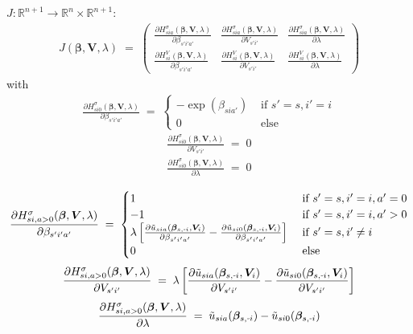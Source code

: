 \documentclass[11pt,fleqn]{article}
\newcommand{\R}{\mathbb{R}}
\newcommand{\bbeta}{\bm{\beta}}
\newcommand{\bV}{\bm{V}}
\newcommand{\tu}{\tilde{u}}
\newcommand{\shortminus}{{\text{\scalebox{0.4}[1.0]{\(-\)}}}}
\newcommand{\minusi}{\shortminus i}
\begin{document}
$J: \R^{n+1} \rightarrow \R^n \times \R^{n+1}$:
\begin{align*}
	J(\bbeta,\bV,\lambda) \;=\; 
	\begin{pmatrix}
		\frac{ \partial H_{sia}^{\sigma}(\bbeta,\bV,\lambda) }{ \partial \beta_{s'i'a'} } & 
		\frac{ \partial H_{sia}^{\sigma}(\bbeta,\bV,\lambda) }{ \partial V_{s'i'} } & 
		\frac{ \partial H_{sia}^{\sigma}(\bbeta,\bV,\lambda) }{ \partial \lambda } \\
		\frac{ \partial H_{si}^{V}(\bbeta,\bV,\lambda) }{ \partial \beta_{s'i'a'} } & 
		\frac{ \partial H_{si}^{V}(\bbeta,\bV,\lambda) }{ \partial V_{s'i'} } & 
		\frac{ \partial H_{si}^{V}(\bbeta,\bV,\lambda) }{ \partial \lambda }
	\end{pmatrix}
\end{align*}
with
\begin{align*}
	\frac{ \partial H_{si0}^{\sigma}(\bbeta,\bV,\lambda) }{ \partial \beta_{s'i'a'} } \;=\; 
	\begin{cases}
		-\exp(\beta_{sia'}) & \text{ if } s'=s, i'=i \\
		0 & \text{ else}
	\end{cases} 
\end{align*}
\begin{align*}
	\frac{ \partial H_{si0}^{\sigma}(\bbeta,\bV,\lambda) }{ \partial V_{s'i'} } \;=\; 0
\end{align*}
\begin{align*}
	\frac{ \partial H_{si0}^{\sigma}(\bbeta,\bV,\lambda) }{ \partial \lambda } \;=\; 0
\end{align*}

\begin{align*}
	\frac{ \partial H_{si,a>0}^{\sigma}(\bbeta,\bV,\lambda) }{ \partial \beta_{s'i'a'} } \;=\; 
		\begin{cases} 
			1 & \text{ if } s'=s, i'=i, a'=0 \\
			-1 & \text{ if } s'=s, i'=i, a'>0 \\
			\lambda \left[ \frac{ \partial \tu_{sia}(\bbeta_{s,\minusi},\bV_i) }{ \partial \beta_{s'i'a'} } - \frac{ \partial \tu_{si0}(\bbeta_{s,\minusi},\bV_i) }{ \partial \beta_{s'i'a'} } \right] & \text{ if } s'=s, i' \neq i \\
			0 & \text{ else}
		\end{cases}
\end{align*}
\begin{align*}
	\frac{ \partial H_{si,a>0}^{\sigma}(\bbeta,\bV,\lambda) }{ \partial V_{s'i'} } \;=\; \lambda \left[ \frac{ \partial \tu_{sia}(\bbeta_{s,\minusi},\bV_i) }{ \partial V_{s'i'} } - \frac{ \partial \tu_{si0}(\bbeta_{s,\minusi},\bV_i) }{ \partial V_{s'i'} } \right] 
\end{align*}
\begin{align*}
	\frac{ \partial H_{si,a>0}^{\sigma}(\bbeta,\bV,\lambda) }{ \partial \lambda } \;=\; \tu_{sia}(\bbeta_{s,\minusi}) - \tu_{si0}(\bbeta_{s,\minusi})
\end{align*}
\end{document}

